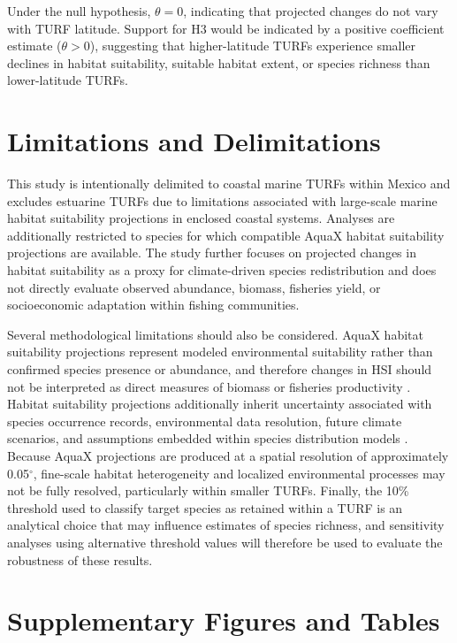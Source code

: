 \documentclass[12pt]{article}
\begin{document}
Under the null hypothesis, $\theta = 0$, indicating that projected changes do not vary with TURF latitude. Support for H3 would be indicated by a positive coefficient estimate ($\theta > 0$), suggesting that higher-latitude TURFs experience smaller declines in habitat suitability, suitable habitat extent, or species richness than lower-latitude TURFs.


 \section{Limitations and Delimitations}

This study is intentionally delimited to coastal marine TURFs within Mexico and excludes estuarine TURFs due to limitations associated with large-scale marine habitat suitability projections in enclosed coastal systems. Analyses are additionally restricted to species for which compatible AquaX habitat suitability projections are available. The study further focuses on projected changes in habitat suitability as a proxy for climate-driven species redistribution and does not directly evaluate observed abundance, biomass, fisheries yield, or socioeconomic adaptation within fishing communities.

Several methodological limitations should also be considered. AquaX habitat suitability projections represent modeled environmental suitability rather than confirmed species presence or abundance, and therefore changes in HSI should not be interpreted as direct measures of biomass or fisheries productivity \citep{Reygondeau2026}. Habitat suitability projections additionally inherit uncertainty associated with species occurrence records, environmental data resolution, future climate scenarios, and assumptions embedded within species distribution models \citep{Reygondeau2026}. Because AquaX projections are produced at a spatial resolution of approximately 0.05$^\circ$, fine-scale habitat heterogeneity and localized environmental processes may not be fully resolved, particularly within smaller TURFs. Finally, the 10\% threshold used to classify target species as retained within a TURF is an analytical choice that may influence estimates of species richness, and sensitivity analyses using alternative threshold values will therefore be used to evaluate the robustness of these results. 





\clearpage
\appendix
{}
\renewcommand\thefigure{\thesection\arabic{figure}}
\renewcommand\thetable{\thesection\arabic{table}}

\section{Supplementary Figures and Tables}
\label{app:species}

%
\end{document}
